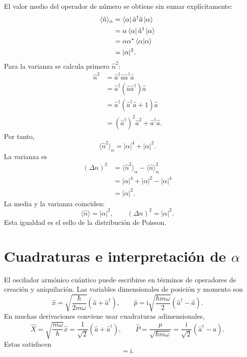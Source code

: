 \documentclass[11pt]{article}
\newcommand{\ii}{\mathrm{i}}
\newcommand{\adag}{\hat a^\dagger}
\begin{document}
El valor medio del operador de n\'umero se obtiene sin sumar expl\'icitamente:
\begin{align}
  \langle \hat n\rangle_\alpha
  &=\bra{\alpha}\adag\hat a\ket{\alpha}\\
  &=\alpha\bra{\alpha}\adag\ket{\alpha}\\
  &=\alpha\alpha^*\braket{\alpha|\alpha}\\
  &=|\alpha|^2.
\end{align}
Para la varianza se calcula primero $\hat n^2$:
\begin{align}
  \hat n^2
  &=\adag\hat a\adag\hat a\\
  &=\adag(\hat a\adag)\hat a\\
  &=\adag(\adag\hat a+1)\hat a\\
  &=(\adag)^2\hat a^2+\adag\hat a.
\end{align}
Por tanto,
\begin{equation}
  \langle \hat n^2\rangle_\alpha
  =|\alpha|^4+|\alpha|^2.
\end{equation}
La varianza es
\begin{align}
  (\Delta n)^2
  &=\langle \hat n^2\rangle_\alpha-\langle \hat n\rangle_\alpha^2\\
  &=|\alpha|^4+|\alpha|^2-|\alpha|^4\\
  &=|\alpha|^2.
\end{align}
La media y la varianza coinciden:
\begin{equation}
  \boxed{\langle\hat n\rangle=|\alpha|^2,
  \qquad
  (\Delta n)^2=|\alpha|^2.}
\end{equation}
Esta igualdad es el sello de la distribuci\'on de Poisson.

\section{\texorpdfstring{Cuadraturas e interpretaci\'on de $\alpha$}{Cuadraturas e interpretacion de alpha}}

El oscilador arm\'onico cu\'antico puede escribirse en t\'erminos de operadores
de creaci\'on y aniquilaci\'on. Las variables dimensionales de posici\'on y
momento son
\begin{equation}
  \hat x
  =\sqrt{\frac{\hbar}{2m\omega}}\left(\hat a+\adag\right),
  \qquad
  \hat p
  =\ii\sqrt{\frac{\hbar m\omega}{2}}\left(\adag-\hat a\right).
\end{equation}
En muchas derivaciones conviene usar cuadraturas adimensionales,
\begin{equation}
  \hat X=\sqrt{\frac{m\omega}{\hbar}}\hat x
  =\frac{1}{\sqrt2}\left(\hat a+\adag\right),
  \qquad
  \hat P=\frac{\hat p}{\sqrt{\hbar m\omega}}
  =\frac{\ii}{\sqrt2}\left(\adag-\hat a\right).
\end{equation}
Estas satisfacen
\begin{equation}
  [\hat X,\hat P]=\ii.
\end{equation}
\end{document}

